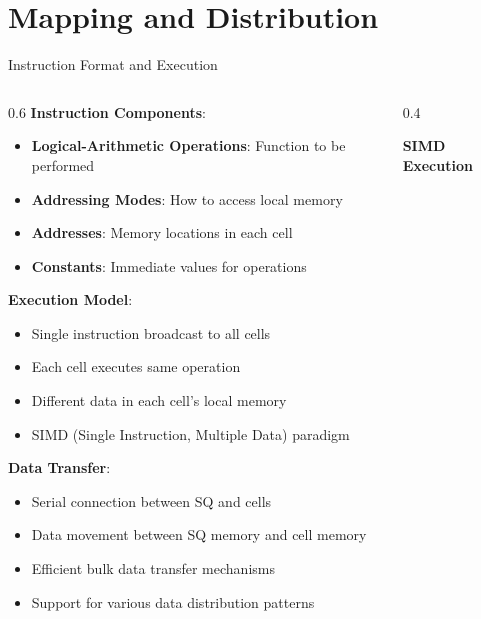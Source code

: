 \documentclass[aspectratio=169]{beamer}
\newcommand{\concept}[1]{\textbf{\color{darkblue}#1}}
\begin{document}
\section{Mapping and Distribution}

\begin{frame}{Instruction Format and Execution}
\begin{columns}
\begin{column}{0.6\textwidth}
\concept{Instruction Components}:
\begin{itemize}
\item \textbf{Logical-Arithmetic Operations}: Function to be performed
\item \textbf{Addressing Modes}: How to access local memory
\item \textbf{Addresses}: Memory locations in each cell
\item \textbf{Constants}: Immediate values for operations
\end{itemize}

\vspace{0.3cm}
\concept{Execution Model}:
\begin{itemize}
\item Single instruction broadcast to all cells
\item Each cell executes same operation
\item Different data in each cell's local memory
\item SIMD (Single Instruction, Multiple Data) paradigm
\end{itemize}

\vspace{0.3cm}
\concept{Data Transfer}:
\begin{itemize}
\item Serial connection between SQ and cells
\item Data movement between SQ memory and cell memory
\item Efficient bulk data transfer mechanisms
\item Support for various data distribution patterns
\end{itemize}
\end{column}
\begin{column}{0.4\textwidth}
\begin{center}
\textbf{SIMD Execution}
\vspace{0.3cm}

\end{center}
\end{column}
\end{columns}
\end{frame}
\end{document}
